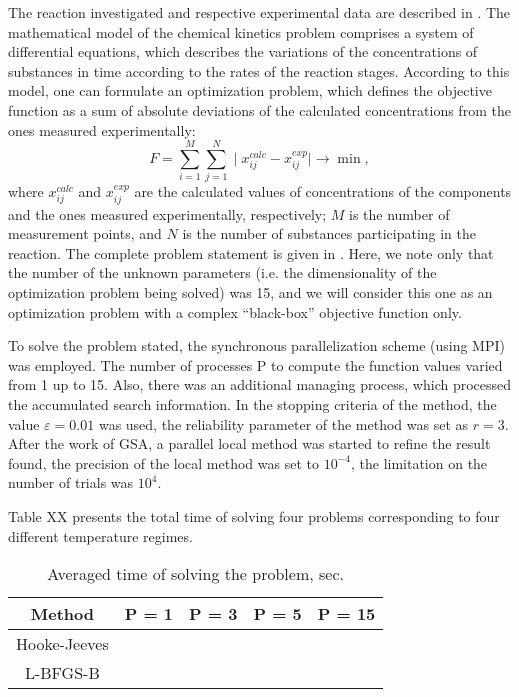 \documentclass[runningheads]{llncs}
\begin{document}
The reaction investigated and respective experimental data are described in \cite{Uskov2020}. The mathematical model of the chemical kinetics problem comprises a system of differential equations, which describes the variations of the concentrations of substances in time according to the rates of the reaction stages. According to this model, one can formulate an optimization problem, which defines the objective function as a sum of absolute deviations of the calculated concentrations from the ones measured experimentally:
\[
F = \sum_{i=1}^{M} \sum_{j=1}^{N} \mid x_{ij}^{calc} - x_{ij}^{exp}\mid \rightarrow \min,
\]
where $x_{ij}^{calc}$ and $x_{ij}^{exp}$ are the calculated values of concentrations of the components and the ones measured experimentally, respectively; $M$ is the number of measurement points, and $N$ is the number of substances participating in the reaction. The complete problem statement is given in \cite{PAVT}. Here, we note only that the number of the unknown parameters (i.e. the dimensionality of the optimization problem being solved) was 15, and we will consider this one as an optimization problem with a complex ``black-box'' objective function only.

To solve the problem stated, the synchronous parallelization scheme (using MPI) was employed. The number of processes P to compute the function values varied from 1 up to 15. Also, there was an additional managing process, which processed the accumulated search information. In the stopping criteria of the method, the value $\varepsilon=0.01$ was used, the reliability parameter of the method was set as $r = 3$. After the work of GSA, a parallel local method was started to refine the result found, the precision of the local method was set to $10^{-4}$, the limitation on the number of trials was $10^4$. 

Table XX presents the total time of solving four problems corresponding to four different temperature regimes.
\begin{table}[ht]
	\caption{Averaged time of solving the problem, sec.}
	\label{tab:11}
	\center
		\begin{tabular}{|c|c|c|c|c|}
		\hline
		Method & P = 1 & P = 3 & P = 5 & P = 15 \\
		\hline 
		Hooke-Jeeves &  &  &  &   \\
		\hline
		L-BFGS-B &  &  &  &   \\
		\hline
	\end{tabular}
\end{table}
\end{document}
